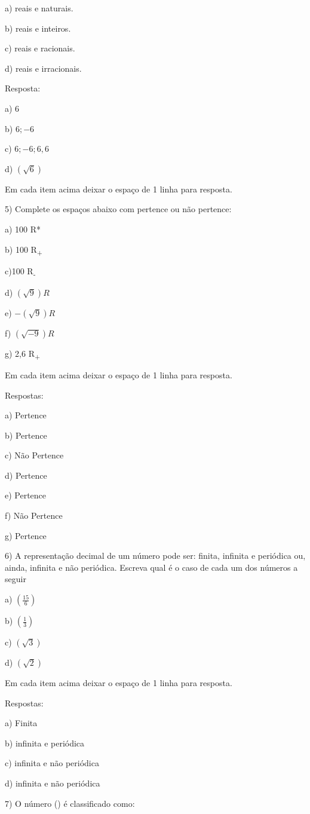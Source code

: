a) reais e naturais.

b) reais e inteiros.

c) reais e racionais.

d) reais e irracionais.

Resposta:

a) $6$

b) $6; -6$

c) $6; -6; 6,6$

d) $(\sqrt{6})$

Em cada item acima deixar o espaço de 1 linha para resposta.

5) Complete os espaços abaixo com pertence ou não pertence:

a) 100 R*

b) 100 R\textsubscript{+}

c)100 R\textsubscript{-}

d) $(\sqrt{9}) R$

e) $- (\sqrt{9}) R$

f) $(\sqrt{- 9}) R$

g) 2,6 R\textsubscript{+}

Em cada item acima deixar o espaço de 1 linha para resposta.

Respostas:

a) Pertence

b) Pertence

c) Não Pertence

d) Pertence

e) Pertence

f) Não Pertence

g) Pertence

6) A representação decimal de um número pode ser: finita, infinita e
periódica ou, ainda, infinita e não periódica. Escreva qual é o caso de
cada um dos números a seguir

a) $(\frac{15}{6})$

b) $(\frac{1}{3})$

c) $(\sqrt{3})$

d) $(\sqrt{2})$

Em cada item acima deixar o espaço de 1 linha para resposta.

Respostas:

a) Finita

b) infinita e periódica

c) infinita e não periódica

d) infinita e não periódica

7) O número (\pi) é classificado como:

